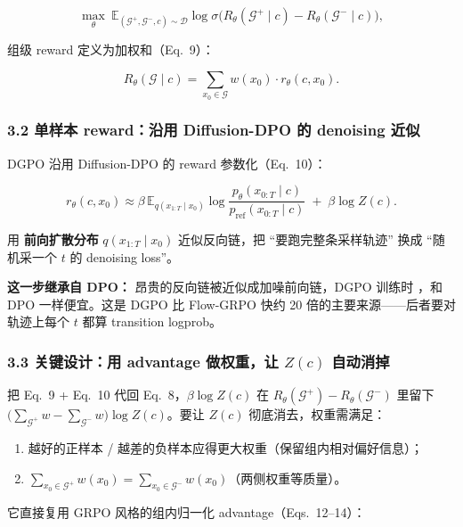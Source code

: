 \[
\max_\theta\ \mathbb{E}_{(\mathcal{G}^{+},\mathcal{G}^{-},c)\sim\mathcal{D}}
\log\sigma\bigl(R_\theta(\mathcal{G}^{+}\mid c)-R_\theta(\mathcal{G}^{-}\mid c)\bigr),
\]

组级 reward 定义为加权和（Eq.~9）：

\[
R_\theta(\mathcal{G}\mid c)=\sum_{x_0\in\mathcal{G}}w(x_0)\cdot r_\theta(c,x_0).
\]

\subsubsection{3.2 单样本 reward：沿用 Diffusion-DPO 的 denoising 近似}

DGPO 沿用 Diffusion-DPO 的 reward 参数化（Eq.~10）：

\[
r_\theta(c,x_0)\approx
\beta\,\mathbb{E}_{q(x_{1:T}\mid x_0)}\!
\log\frac{p_\theta(x_{0:T}\mid c)}{p_{\text{ref}}(x_{0:T}\mid c)}
\;+\;\beta\log Z(c).
\]

用 \textbf{前向扩散分布} $q(x_{1:T}\mid x_0)$ 近似反向链，把 ``要跑完整条采样轨迹'' 换成 ``随机采一个 $t$ 的 denoising loss''。

\begin{warnbox}
\textbf{这一步继承自 DPO：} 昂贵的反向链被近似成加噪前向链，DGPO 训练时 ，和 DPO 一样便宜。这是 DGPO 比 Flow-GRPO 快约 20 倍的主要来源——后者要对轨迹上每个 $t$ 都算 transition logprob。
\end{warnbox}

\subsubsection{\texorpdfstring{3.3 关键设计：用 advantage 做权重，让 $Z(c)$ 自动消掉}{3.3 关键设计：用 advantage 做权重，让 Z(c) 自动消掉}}

把 Eq.~9 + Eq.~10 代回 Eq.~8，$\beta\log Z(c)$ 在 $R_\theta(\mathcal{G}^{+})-R_\theta(\mathcal{G}^{-})$ 里留下 $\bigl(\sum_{\mathcal{G}^{+}}w-\sum_{\mathcal{G}^{-}}w\bigr)\log Z(c)$。要让 $Z(c)$ 彻底消去，权重需满足：

\begin{enumerate}[leftmargin=1.5em]
  \item 越好的正样本 / 越差的负样本应得更大权重（保留组内相对偏好信息）；
  \item $\sum_{x_0\in\mathcal{G}^{+}}w(x_0)=\sum_{x_0\in\mathcal{G}^{-}}w(x_0)$（两侧权重等质量）。
\end{enumerate}

它直接复用 GRPO 风格的组内归一化 advantage（Eqs.~12--14）：

